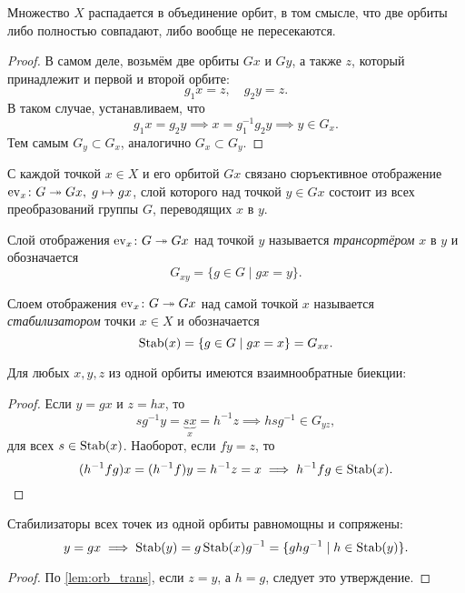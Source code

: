 \begin{proposition}
    Множество $X$ распадается в объединение орбит, в том смысле, что две орбиты либо полностью совпадают, либо вообще не пересекаются. 
\end{proposition}
\begin{proof}
    В самом деле, возьмём две орбиты $Gx$ и $Gy$, а также $z$, который принадлежит и первой и второй орбите: \[g_1x = z, \quad g_2y = z.\]
    В таком случае, устанавливаем, что $$g_1x = g_2y \implies x = g_1^{-1}g_2y \implies y \in G_x.$$
    Тем самым $G_y \subset G_x$, аналогично $G_x \subset G_y$.
\end{proof}

С каждой точкой $x \in X$ и его орбитой $Gx$ связано сюръективное отображение $\operatorname{ev}_x \colon G \twoheadrightarrow Gx,\; g \mapsto gx$, слой которого над точкой $y \in Gx$ состоит из всех преобразований группы $G$, переводящих $x$ в $y$. 
\begin{definition}
    [Транспортёр]
    Слой отображения $\operatorname{ev}_x \colon G \twoheadrightarrow Gx$ над точкой $y$ называется \emph{трансортёром} $x$ в $y$ и обозначается \[G_{xy} = \{g \in G \mid gx = y\}.\]
\end{definition}
\begin{definition}[Стабилизатор]
    Слоем отображения $\operatorname{ev}_x \colon G \twoheadrightarrow Gx$ над самой точкой $x$ называется \emph{стабилизатором} точки $x \in X$ и обозначается \[ \operatorname{Stab}(x) = \{g \in G \mid gx = x \} = G_{xx}.\]
\end{definition}

\begin{lemma}\label{lem:orb_trans}
    Для любых $x, y, z$ из одной орбиты имеются взаимнообратные биекции:
    \begin{center}
    \end{center}
\end{lemma}
\begin{proof}
    Если $y = gx$ и $z = hx$, то $$sg^{-1}y = \underbrace{sx}_{x} = h^{-1}z \implies hsg^{-1} \in G_{yz}, $$
    для всех $s \in \operatorname{Stab}(x)$. Наоборот, если $fy = z$, то \[
        (h^{-1}fg)x = (h^{-1}f)y = {h^{-1}}z = x \implies h^{-1}fg \in \operatorname{Stab}(x).
    \]
\end{proof}

\begin{proposition}
    Стабилизаторы всех точек из одной орбиты равномощны и сопряжены: \[
    y = gx \implies \operatorname{Stab}(y) = g \operatorname{Stab}(x) g^{-1} = \{ ghg^{-1} \mid h \in \operatorname{Stab}(y) \}.\]
    \begin{proof}
        По \cref{lem:orb_trans}, если $z = y$, а $h=g$, следует это утверждение.
    \end{proof}
\end{proposition}
